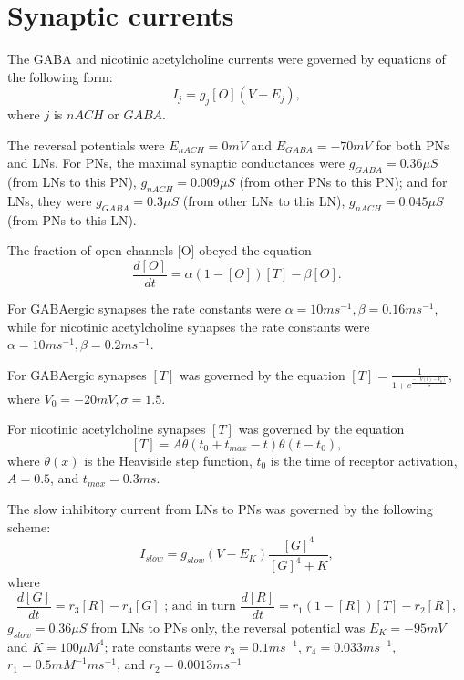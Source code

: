 \documentclass[12pt, a4paper]{article}%
\begin{document}
\section{Synaptic currents}%
The GABA and nicotinic acetylcholine currents were governed by equations of the following form:
$$I_{j} = g_{j} [O](V - E_{j} ), $$ where $j$ is $nACH$ or $GABA$.

The reversal potentials were $E_{nACH} = 0 mV$ and $E_{GABA} = -70 mV$ for both PNs and LNs.
For PNs, the maximal synaptic conductances were $g_{GABA} = 0.36\mu S$ (from LNs to this PN), $g_{nACH} = 0.009\mu S$ (from other PNs to this PN); and for LNs, they were $g_{GABA} = 0.3\mu S$ (from other LNs to this LN), $g_{nACH} = 0.045 \mu S$ (from PNs to this LN).

The fraction of open channels [O] obeyed the equation $$\frac{d[O]}{dt} = \alpha(1 - [O])[T] - \beta [O].$$

For GABAergic synapses the rate constants were $\alpha = 10 ms^{-1} , \beta = 0.16 ms^{-1}$, while for nicotinic acetylcholine synapses the rate constants were $\alpha = 10 ms^{-1}, \beta = 0.2 ms^{-1}$.

For GABAergic synapses $[T]$ was governed by the equation $[T] = \frac{1}{1 + e^{\frac{-(V(t) - V_{0})}{\sigma}} },$ where $V_{0} = -20 mV , \sigma = 1.5$.

For nicotinic acetylcholine synapses $[T]$ was governed by the equation $$[T] = A \theta(t_{0} + t_{max} - t) \theta(t - t_{0}),$$ where $\theta(x)$ is the Heaviside step function, $t_{0}$ is the time of receptor activation, $A = 0.5$, and $t_{max} = 0.3 ms$.

The slow inhibitory current from LNs to PNs was governed by the following scheme:
$$ I_{slow} = g_{slow}(V-E_{K})\frac{[G]^{4}}{[G]^{4}+K}, $$ where
$$ \frac{d[G]}{dt} = r_{3}[R] -r_{4}[G] \mbox{ ; and in turn   } \frac{d[R]}{dt} = r_{1} (1-[R])[T]-r_{2}[R],$$ $g_{slow} = 0.36 \mu S$ from LNs to PNs only, the reversal potential was $E_{K} = -95 mV$ and $K = 100 \mu M^{4}$; rate constants were $r_{3} = 0.1 ms^{-1}$, $r_{4} = 0.033 ms^{-1}$, $r_{1} = 0.5 mM^{-1}ms^{-1}$, and $r_{2} = 0.0013 ms^{-1}$

\end{document}
